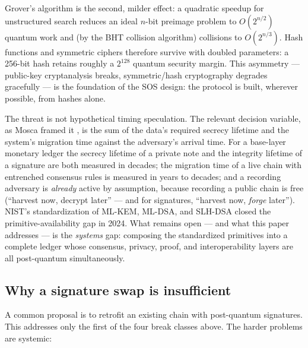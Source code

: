\documentclass[11pt]{article}
\theoremstyle{plain}
\theoremstyle{definition}
\theoremstyle{remark}
\begin{document}
Grover's algorithm \cite{grover1996} is the second, milder effect: a quadratic
speedup for unstructured search reduces an ideal $n$-bit preimage problem to
$O(2^{n/2})$ quantum work and (by the BHT collision algorithm) collisions to
$O(2^{n/3})$. Hash functions and symmetric ciphers therefore survive with
doubled parameters: a 256-bit hash retains roughly a $2^{128}$ quantum security
margin. This asymmetry --- public-key cryptanalysis breaks, symmetric/hash
cryptography degrades gracefully --- is the foundation of the SOS design: the
protocol is built, wherever possible, from hashes alone.

The threat is not hypothetical timing speculation. The relevant decision
variable, as Mosca framed it \cite{mosca2018}, is the sum of the data's
required secrecy lifetime and the system's migration time against the
adversary's arrival time. For a base-layer monetary ledger the secrecy lifetime
of a private note and the integrity lifetime of a signature are both measured
in decades; the migration time of a live chain with entrenched consensus rules
is measured in years to decades; and a recording adversary is \emph{already}
active by assumption, because recording a public chain is free
(``harvest now, decrypt later'' --- and for signatures, ``harvest now,
\emph{forge} later''). NIST's standardization of ML-KEM, ML-DSA, and SLH-DSA
\cite{fips203,fips204,fips205,nistir8413} closed the primitive-availability
gap in 2024. What remains open --- and what this paper addresses --- is the
\emph{systems} gap: composing the standardized primitives into a complete
ledger whose consensus, privacy, proof, and interoperability layers are all
post-quantum simultaneously.

\subsection{Why a signature swap is insufficient}
\label{sec:whole-system}

A common proposal is to retrofit an existing chain with post-quantum
signatures. This addresses only the first of the four break classes above.
The harder problems are systemic:
\end{document}
